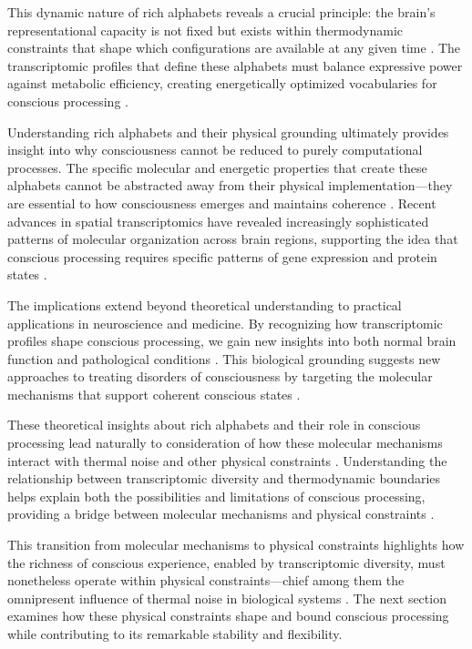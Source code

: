\begin{refsection}
This dynamic nature of rich alphabets reveals a crucial principle: the brain's representational capacity is not fixed but exists within thermodynamic constraints that shape which configurations are available at any given time \cite{hawrylycz2016inferring}. The transcriptomic profiles that define these alphabets must balance expressive power against metabolic efficiency, creating energetically optimized vocabularies for conscious processing \cite{lake2016neuronal}.

Understanding rich alphabets and their physical grounding ultimately provides insight into why consciousness cannot be reduced to purely computational processes. The specific molecular and energetic properties that create these alphabets cannot be abstracted away from their physical implementation—they are essential to how consciousness emerges and maintains coherence \cite{siletti2023transcriptomic}. Recent advances in spatial transcriptomics have revealed increasingly sophisticated patterns of molecular organization across brain regions, supporting the idea that conscious processing requires specific patterns of gene expression and protein states \cite{macosko2015highly}.

The implications extend beyond theoretical understanding to practical applications in neuroscience and medicine. By recognizing how transcriptomic profiles shape conscious processing, we gain new insights into both normal brain function and pathological conditions \cite{nowakowski2017spatiotemporal}. This biological grounding suggests new approaches to treating disorders of consciousness by targeting the molecular mechanisms that support coherent conscious states \cite{yuste2020community}.

These theoretical insights about rich alphabets and their role in conscious processing lead naturally to consideration of how these molecular mechanisms interact with thermal noise and other physical constraints \cite{raj2008nature}. Understanding the relationship between transcriptomic diversity and thermodynamic boundaries helps explain both the possibilities and limitations of conscious processing, providing a bridge between molecular mechanisms and physical constraints \cite{zeisel2015cell}.

This transition from molecular mechanisms to physical constraints highlights how the richness of conscious experience, enabled by transcriptomic diversity, must nonetheless operate within physical constraints—chief among them the omnipresent influence of thermal noise in biological systems \cite{trapnell2015defining}. The next section examines how these physical constraints shape and bound conscious processing while contributing to its remarkable stability and flexibility.


\end{refsection}
